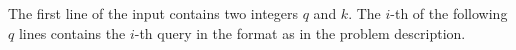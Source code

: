 The first line of the input contains two integers $q$ and $k$. 
The $i$-th of the following $q$ lines contains the $i$-th query
in the format as in the problem description.